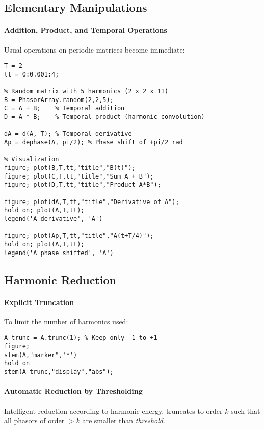 \documentclass[11pt,a4paper]{article}
\begin{document}
\subsection{Elementary Manipulations}

\paragraph{Addition, Product, and Temporal Operations}  
Usual operations on periodic matrices become immediate:

\begin{lstlisting}[style=matlabstyle]
T = 2
tt = 0:0.001:4;

% Random matrix with 5 harmonics (2 x 2 x 11)
B = PhasorArray.random(2,2,5); 
C = A + B;    % Temporal addition
D = A * B;    % Temporal product (harmonic convolution)

dA = d(A, T); % Temporal derivative
Ap = dephase(A, pi/2); % Phase shift of +pi/2 rad

% Visualization
figure; plot(B,T,tt,"title","B(t)");
figure; plot(C,T,tt,"title","Sum A + B");
figure; plot(D,T,tt,"title","Product A*B");

figure; plot(dA,T,tt,"title","Derivative of A");
hold on; plot(A,T,tt);
legend('A derivative', 'A')

figure; plot(Ap,T,tt,"title","A(t+T/4)");
hold on; plot(A,T,tt);
legend('A phase shifted', 'A')
\end{lstlisting}

\subsection{Harmonic Reduction}

\paragraph{Explicit Truncation}  
To limit the number of harmonics used:

\begin{lstlisting}[style=matlabstyle]
A_trunc = A.trunc(1); % Keep only -1 to +1
figure; 
stem(A,"marker",'*')
hold on
stem(A_trunc,"display","abs");
\end{lstlisting}

\paragraph{Automatic Reduction by Thresholding}  
Intelligent reduction according to harmonic energy, truncates to order $k$ such that all phasors of order $>k$ are smaller than \textit{threshold}.
\end{document}
